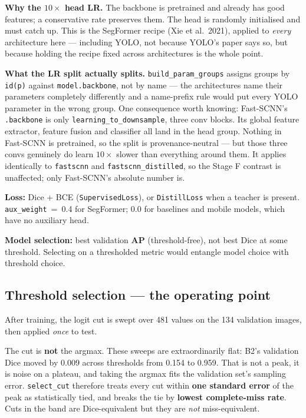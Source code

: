 \documentclass[11pt]{article}
\begin{document}
\textbf{Why the $10\times$ head LR.} The backbone is pretrained and already has
good features; a conservative rate preserves them. The head is randomly
initialised and must catch up. This is the SegFormer recipe (Xie et al.\ 2021),
applied to \emph{every} architecture here --- including YOLO, not because YOLO's
paper says so, but because holding the recipe fixed across architectures is the
whole point.

\textbf{What the LR split actually splits.} \texttt{build\_param\_groups}
assigns groups by \texttt{id(p)} against \texttt{model.backbone}, not by name ---
the architectures name their parameters completely differently and a name-prefix
rule would put every YOLO parameter in the wrong group. One consequence worth
knowing: Fast-SCNN's \texttt{.backbone} is only \texttt{learning\_to\_downsample},
three conv blocks. Its global feature extractor, feature fusion and classifier
all land in the head group. Nothing in Fast-SCNN is pretrained, so the split is
provenance-neutral --- but those three convs genuinely do learn $10\times$ slower
than everything around them. It applies identically to \texttt{fastscnn} and
\texttt{fastscnn\_distilled}, so the Stage F contrast is unaffected; only
Fast-SCNN's absolute number is.

\textbf{Loss:} Dice + BCE (\texttt{SupervisedLoss}), or \texttt{DistillLoss} when
a teacher is present. \texttt{aux\_weight}~=~0.4 for SegFormer; 0.0 for baselines
and mobile models, which have no auxiliary head.

\textbf{Model selection:} best validation \textbf{AP} (threshold-free), not best
Dice at some threshold. Selecting on a thresholded metric would entangle model
choice with threshold choice.

\subsection{Threshold selection --- the operating point}

After training, the logit cut is swept over 481 values on the 134 validation
images, then applied \emph{once} to test.

The cut is \textbf{not} the argmax. These sweeps are extraordinarily flat: B2's
validation Dice moved by 0.009 across thresholds from 0.154 to 0.959. That is not
a peak, it is noise on a plateau, and taking the argmax fits the validation set's
sampling error. \texttt{select\_cut} therefore treats every cut within
\textbf{one standard error} of the peak as statistically tied, and breaks the tie
by \textbf{lowest complete-miss rate}. Cuts in the band are Dice-equivalent but
they are \emph{not} miss-equivalent.
\end{document}
